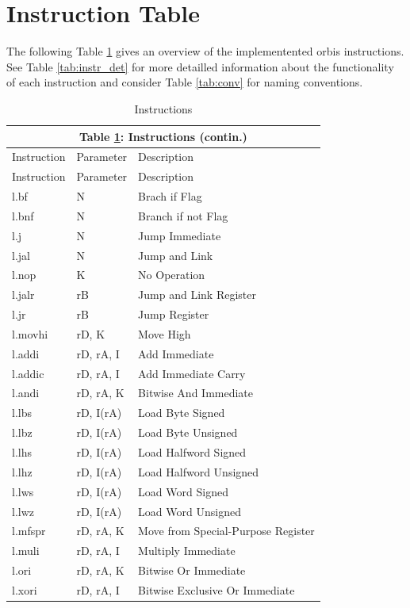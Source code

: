 \section{Instruction Table}
The following Table \ref{tab:instr} gives an overview of the implementented \gls{orbis} instructions. See Table \ref{tab:instr_det} for more detailled information about the functionality of each instruction and consider Table \ref{tab:conv} for naming conventions.
\begin{longtable}{|p{1.8cm}|l|p{10cm}|}
\caption[Instructions]{Instructions}

\label{tab:instr}
\endfirsthead
\multicolumn{3}{c}{Table \ref{tab:instr}: Instructions (contin.)} \\ \hline
Instruction & Parameter & Description \\ \hline
\endhead
\endfoot
\endlastfoot
\hline
Instruction & Parameter & Description \\ \hline
l.bf&N&Brach if Flag\\ \hline
l.bnf&N&Branch if not Flag\\ \hline
l.j&N&Jump Immediate\\ \hline
l.jal&N&Jump and Link\\ \hline \hline

l.nop&K&No Operation\\ \hline \hline

l.jalr&rB&Jump and Link Register\\ \hline
l.jr&rB&Jump Register\\ \hline \hline

l.movhi&rD, K&Move High\\ \hline
l.addi&rD, rA, I&Add Immediate\\ \hline
l.addic&rD, rA, I&Add Immediate Carry\\ \hline
l.andi&rD, rA, K&Bitwise And Immediate\\ \hline
l.lbs&rD, I(rA)&Load Byte Signed\\ \hline
l.lbz&rD, I(rA)&Load Byte Unsigned\\ \hline
l.lhs&rD, I(rA)&Load Halfword Signed\\ \hline
l.lhz&rD, I(rA)&Load Halfword Unsigned\\ \hline
l.lws&rD, I(rA)&Load Word Signed\\ \hline
l.lwz&rD, I(rA)&Load Word Unsigned\\ \hline
l.mfspr&rD, rA, K&Move from Special-Purpose Register\\ \hline
l.muli&rD, rA, I&Multiply Immediate\\ \hline
l.ori&rD, rA, K&Bitwise Or Immediate\\ \hline
l.xori&rD, rA, I&Bitwise Exclusive Or Immediate\\ \hline \hline


\end{longtable}
